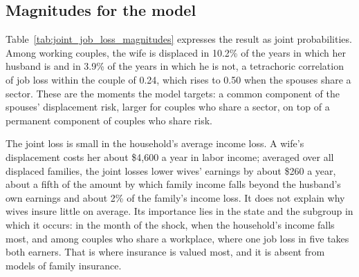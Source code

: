 \subsection{Magnitudes for the model}

Table~\ref{tab:joint_job_loss_magnitudes} expresses the result as joint probabilities. Among working couples, the wife
is displaced in 10.2\% of the years in which her husband is and in 3.9\% of the years in which he is not, a tetrachoric
correlation of job loss within the couple of 0.24, which rises to 0.50 when the spouses share a sector. These are the
moments the model targets: a common component of the spouses' displacement risk, larger for couples who share a sector,
on top of a permanent component of couples who share risk.

The joint loss is small in the household's average income loss. A wife's displacement costs her about \$4,600 a year in
labor income; averaged over all displaced families, the joint losses lower wives' earnings by about \$260 a year, about
a fifth of the amount by which family income falls beyond the husband's own earnings and about 2\% of the family's
income loss. It does not explain why wives insure little on average. Its importance lies in the state and the
subgroup in which it occurs: in the month of the shock, when the household's income falls most, and among couples who
share a workplace, where one job loss in five takes both earners. That is where insurance is valued most, and it is
absent from models of family insurance.
